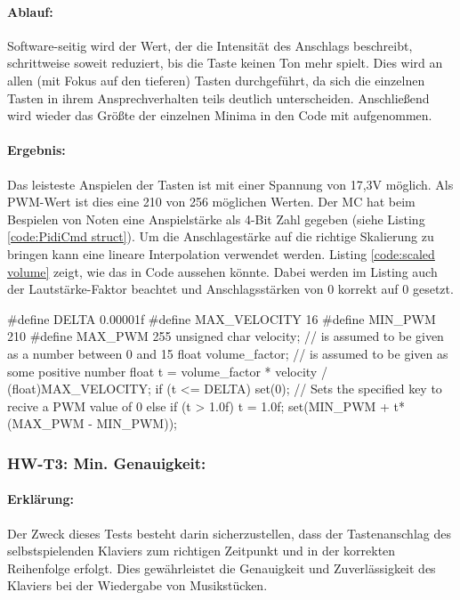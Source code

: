 \paragraph{Ablauf:}
Software-seitig wird der Wert, der die Intensität des Anschlags beschreibt, schrittweise soweit reduziert, bis die Taste keinen Ton mehr spielt.
Dies wird an allen (mit Fokus auf den tieferen) Tasten durchgeführt, da sich die einzelnen Tasten in ihrem Ansprechverhalten teils deutlich unterscheiden.
Anschließend wird wieder das Größte der einzelnen Minima in den Code mit aufgenommen.

\paragraph{Ergebnis:}
Das leisteste Anspielen der Tasten ist mit einer Spannung von 17,3V möglich.
Als \ac{PWM}-Wert ist dies eine 210 von 256 möglichen Werten.
Der \ac{MC} hat beim Bespielen von Noten eine Anspielstärke als 4-Bit Zahl gegeben (siehe Listing \ref{code:PidiCmd struct}).
Um die Anschlagestärke auf die richtige Skalierung zu bringen kann eine lineare Interpolation verwendet werden.
Listing \ref{code:scaled volume} zeigt, wie das in Code aussehen könnte.
Dabei werden im Listing auch der Lautstärke-Faktor beachtet und Anschlagsstärken von 0 korrekt auf 0 gesetzt.

\begin{UnbrokenCodePage}[style=CStyle, caption={Skalierung der Lautstärke bei der Ausgabe}, label={code:scaled volume}]
#define DELTA 0.00001f
#define MAX_VELOCITY 16
#define MIN_PWM 210
#define MAX_PWM 255
unsigned char velocity; // is assumed to be given as a number between 0 and 15
float volume_factor;    // is assumed to be given as some positive number
float t = volume_factor * velocity / (float)MAX_VELOCITY;
if (t <= DELTA) {
	set(0); // Sets the specified key to recive a PWM value of 0
} else {
	if (t > 1.0f) t = 1.0f;
	set(MIN_PWM + t*(MAX_PWM - MIN_PWM));
}
\end{UnbrokenCodePage}


\subsubsection{HW-T3: Min. Genauigkeit:}

\paragraph{Erklärung:}
Der Zweck dieses Tests besteht darin sicherzustellen, dass der Tastenanschlag des selbstspielenden Klaviers zum richtigen
Zeitpunkt und in der korrekten Reihenfolge erfolgt. Dies gewährleistet die Genauigkeit und Zuverlässigkeit des Klaviers
bei der Wiedergabe von Musikstücken.

